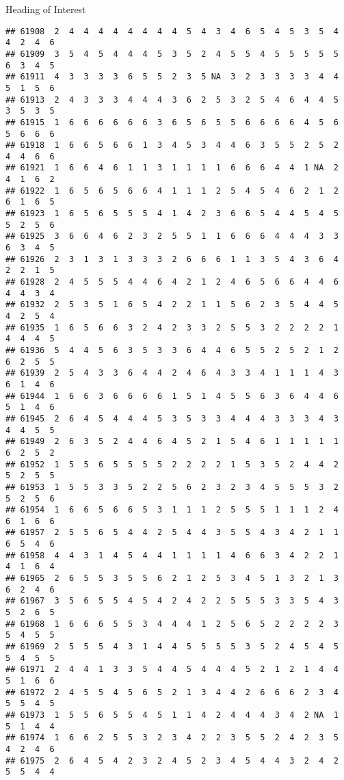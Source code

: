 \documentclass[
  ignorenonframetext,
]{beamer}
\begin{document}
\begin{frame}[fragile]{Heading of Interest}
\begin{verbatim}
## 61908  2  4  4  4  4  4  4  4  4  5  4  3  4  6  5  4  5  3  5  4  4  2  4  6
## 61909  3  5  4  5  4  4  4  5  3  5  2  4  5  5  4  5  5  5  5  5  6  3  4  5
## 61911  4  3  3  3  3  6  5  5  2  3  5 NA  3  2  3  3  3  3  4  4  5  1  5  6
## 61913  2  4  3  3  3  4  4  4  3  6  2  5  3  2  5  4  6  4  4  5  3  5  3  5
## 61915  1  6  6  6  6  6  6  3  6  5  6  5  5  6  6  6  6  4  5  6  5  6  6  6
## 61918  1  6  6  5  6  6  1  3  4  5  3  4  4  6  3  5  5  2  5  2  4  4  6  6
## 61921  1  6  6  4  6  1  1  3  1  1  1  1  6  6  6  4  4  1 NA  2  4  1  6  2
## 61922  1  6  5  6  5  6  6  4  1  1  1  2  5  4  5  4  6  2  1  2  6  1  6  5
## 61923  1  6  5  6  5  5  5  4  1  4  2  3  6  6  5  4  4  5  4  5  5  2  5  6
## 61925  3  6  6  4  6  2  3  2  5  5  1  1  6  6  6  4  4  4  3  3  6  3  4  5
## 61926  2  3  1  3  1  3  3  3  2  6  6  6  1  1  3  5  4  3  6  4  2  2  1  5
## 61928  2  4  5  5  5  4  4  6  4  2  1  2  4  6  5  6  6  4  4  6  4  4  3  4
## 61932  2  5  3  5  1  6  5  4  2  2  1  1  5  6  2  3  5  4  4  5  4  2  5  4
## 61935  1  6  5  6  6  3  2  4  2  3  3  2  5  5  3  2  2  2  2  1  4  4  4  5
## 61936  5  4  4  5  6  3  5  3  3  6  4  4  6  5  5  2  5  2  1  2  6  2  5  5
## 61939  2  5  4  3  3  6  4  4  2  4  6  4  3  3  4  1  1  1  4  3  6  1  4  6
## 61944  1  6  6  3  6  6  6  6  1  5  1  4  5  5  6  3  6  4  4  6  5  1  4  6
## 61945  2  6  4  5  4  4  4  5  3  5  3  3  4  4  4  3  3  3  4  3  4  4  5  5
## 61949  2  6  3  5  2  4  4  6  4  5  2  1  5  4  6  1  1  1  1  1  6  2  5  2
## 61952  1  5  5  6  5  5  5  5  2  2  2  2  1  5  3  5  2  4  4  2  5  2  5  5
## 61953  1  5  5  3  3  5  2  2  5  6  2  3  2  3  4  5  5  5  3  2  5  2  5  6
## 61954  1  6  6  5  6  6  5  3  1  1  1  2  5  5  5  1  1  1  2  4  6  1  6  6
## 61957  2  5  5  6  5  4  4  2  5  4  4  3  5  5  4  3  4  2  1  1  6  5  4  6
## 61958  4  4  3  1  4  5  4  4  1  1  1  1  4  6  6  3  4  2  2  1  4  1  6  4
## 61965  2  6  5  5  3  5  5  6  2  1  2  5  3  4  5  1  3  2  1  3  6  2  4  6
## 61967  3  5  6  5  5  4  5  4  2  4  2  2  5  5  5  3  3  5  4  3  5  2  6  5
## 61968  1  6  6  6  5  5  3  4  4  4  1  2  5  6  5  2  2  2  2  3  5  4  5  5
## 61969  2  5  5  5  4  3  1  4  4  5  5  5  5  3  5  2  4  5  4  5  5  4  5  5
## 61971  2  4  4  1  3  3  5  4  4  5  4  4  4  5  2  1  2  1  4  4  5  1  6  6
## 61972  2  4  5  5  4  5  6  5  2  1  3  4  4  2  6  6  6  2  3  4  5  5  4  5
## 61973  1  5  5  6  5  5  4  5  1  1  4  2  4  4  4  3  4  2 NA  1  5  1  4  4
## 61974  1  6  6  2  5  5  3  2  3  4  2  2  3  5  5  2  4  2  3  5  4  2  4  6
## 61975  2  6  4  5  4  2  3  2  4  5  2  3  4  5  4  4  3  2  4  2  5  5  4  4

\end{verbatim}
\end{frame}
\end{document}
